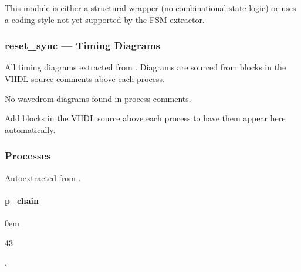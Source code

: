 \documentclass[letterpaper,10pt,english]{sphinxmanual}
\begin{document}
\sphinxAtStartPar
This module is either a structural wrapper (no combinational
state logic) or uses a coding style not yet supported by the
FSM extractor.

\sphinxstepscope


\subsubsection{reset\_sync — Timing Diagrams}
\label{\detokenize{modules/reset_sync/timing:reset-sync-timing-diagrams}}\label{\detokenize{modules/reset_sync/timing::doc}}
\sphinxAtStartPar
All timing diagrams extracted from .
Diagrams are sourced from  blocks in the VHDL
source comments above each process.

\sphinxAtStartPar
No wavedrom diagrams found in process comments.

\sphinxAtStartPar
Add  blocks in the VHDL source above each
process to have them appear here automatically.

\sphinxstepscope


\subsubsection{Processes}
\label{\detokenize{modules/reset_sync/processes/index:processes}}\label{\detokenize{modules/reset_sync/processes/index::doc}}
\sphinxAtStartPar
Auto\sphinxhyphen{}extracted from .

\sphinxstepscope


\paragraph{p\_chain}
\label{\detokenize{modules/reset_sync/processes/p_chain:p-chain}}\label{\detokenize{modules/reset_sync/processes/p_chain::doc}}
\begin{DUlineblock}{0em}
\item[]  
\item[]  43
\item[]  
\item[]  , 
\end{DUlineblock}
\end{document}
